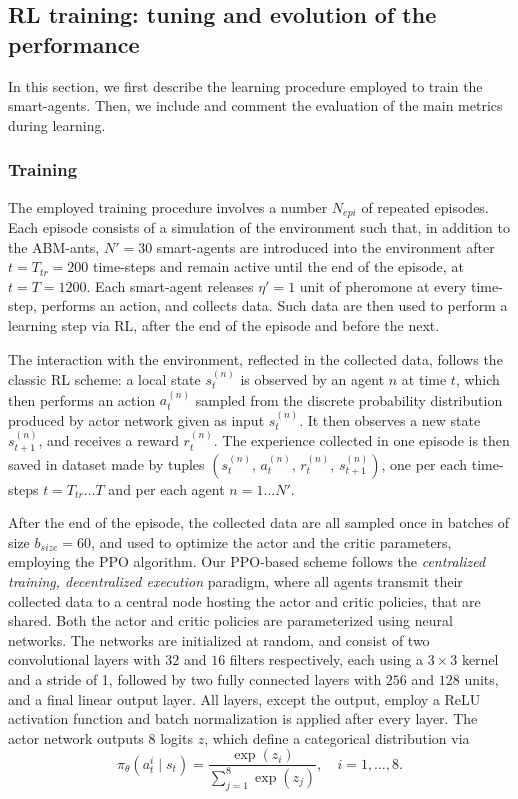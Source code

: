 
\subsection{RL training: tuning and evolution of the performance}
In this section, we first describe the learning procedure employed to train the smart-agents. Then, we include and comment the evaluation of the main metrics during learning. 

\subsubsection{Training}
\label{sec:training_res}

The employed training procedure involves a number $N_{epi}$ of repeated episodes. Each episode consists of a simulation of the environment such that, in addition to the ABM-ants, $N' = 30$ smart-agents are introduced into the environment after $t = T_{tr} = 200$ time-steps and remain active until the end of the episode, at $t = T = 1200$. Each smart-agent releases $\eta' = 1$ unit of pheromone at every time-step, performs an action, and collects data. Such data are then used to perform a learning step via RL, after the end of the episode and before the next. 

The interaction with the environment, reflected in the collected data, follows the classic RL scheme: a local state $s_t^{(n)}$ is observed by an agent $n$ at time $t$, which then performs an action $a_t^{(n)}$ sampled from the discrete probability distribution produced by actor network given as input $s^{(n)}_t$. It then observes a new state $s^{(n)}_{t+1}$, and receives a reward $r_t^{(n)}$. The experience collected in one episode is then saved in dataset made by tuples $(s_t^{(n)}, \, a_{t}^{(n)}, \, r_{t}^{(n)}, \, s_{t+1}^{(n)})$, one per each time-steps $t= T_{tr} \dots T$ and per each agent $n=1 \dots N'$.

After the end of the episode, the collected data are all sampled once in batches of size $b_{size}=60$, and used to optimize the actor and the critic parameters, employing the PPO algorithm. Our PPO-based scheme follows the \textit{centralized training, decentralized execution} paradigm, where all agents transmit their collected data to a central node hosting the actor and critic policies, that are shared. Both the actor and critic policies are parameterized using neural networks. The networks are initialized at random, and consist of two convolutional layers with $32$ and $16$ filters respectively, each using a $3 \times 3$ kernel and a stride of 1, followed by two fully connected layers with $256$ and $128$ units, and a final linear output layer. All layers, except the output, employ a ReLU activation function and batch normalization is applied after every layer.
The actor network outputs $8$ logits $z$, which define a categorical distribution via
\[
\pi_\theta(a_t^i \mid s_t) = 
\frac{\exp(z_i)}{\sum_{j=1}^8 \exp(z_j)}, 
\quad i=1,\dots,8.
\]

